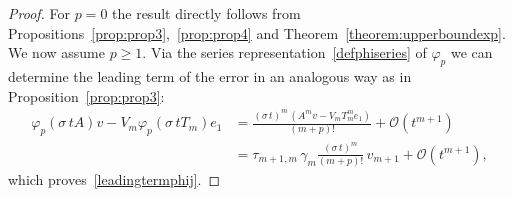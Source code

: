 \documentclass[smallextended]{svjour3pre}%
\numberwithin{equation}{section}
\numberwithin{figure}{section}
\numberwithin{table}{section}
\newcommand\phif\varphi
\newcommand\sca{\sigma}
\newcommand\Opgen{A}
\begin{document}
\begin{proof}
For $p=0$ the result directly follows from Propositions~\ref{prop:prop3},~\ref{prop:prop4} and Theorem~\ref{theorem:upperboundexp}. We now assume $ p \geq 1 $.
Via the series representation~\eqref{defphiseries} of $\phif_p$
we can determine the leading term of the error in an analogous way
as in Proposition~\ref{prop:prop3}:
\begin{align*}
\phif_p(\sca\,t \Opgen)v -  V_m \phif_p(\sca\,t T_m) e_1
&= \frac{(\sca\,t)^m \,(A^m v - V_m T_m^m e_1)}{(m+p)!} + \mathcal{O}(t^{m+1}) \\
&= \tau_{m+1,m}\,\gamma_m \frac{(\sca\, t)^m}{(m+p)!} \, v_{m+1} + \mathcal{O}(t^{m+1}),
\end{align*}
which proves~\eqref{leadingtermphij}.


\end{proof}
\end{document}
